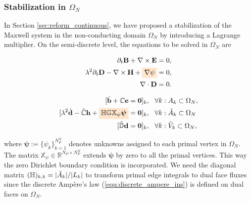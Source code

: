\documentclass{article}
\begin{document}
\subsubsection{Stabilization in $\Omega_N$} \label{sec:reform-discrete}

In Section \ref{sec:reform_continuous}, we have proposed a stabilization of the Maxwell
system in the non-conducting domain $\Omega_N$ by introducing a Lagrange multiplier. On
the semi-discrete level, the equations to be solved in $\Omega_N$ are
\begin{center}
    \begin{minipage}{0.3\textwidth}
    \begin{align*}
        \partial_t \mathbf{B} + \nabla \times \mathbf{E} &= 0, \\ 
        \lambda^2 \partial_t \mathbf{D} - \nabla \times \mathbf{H} + \colorbox{orange!20}{$\nabla \psi$} &= 0, \\
        \nabla \cdot \mathbf{D} &= 0. 
    \end{align*}
    \end{minipage}
    \begin{minipage}{0.1\textwidth}
    \centering
    \end{minipage}
    \begin{minipage}{0.5\textwidth}
        \begin{subequations}
        \begin{align}
            [\dot{\mathbf{b}} + \mathbb{C}\mathbf{e} &= \mathbf{0}]_k,\ \ \forall k:A_k \subset \Omega_N,\\
            [\lambda^2\dot{\mathbf{d}} - \Tilde{\mathbb{C}}\mathbf{h} + \colorbox{orange!20}{$\mathbb{H} \mathbb{G} \mathbb{X}_\psi \bm{\psi}$}&= \mathbf{0}]_k, \ \ \forall k: \Tilde{A}_k \subset \Omega_N \label{equ:discrete_ampere_ins}\\
            [\Tilde{\mathbb{D}}\mathbf{d} &= \mathbf{0}]_k,\ \ \forall k:\Tilde{V}_k \subset \Omega_N \label{equ:discrete_zero_div}, 
        \end{align} 
    \end{subequations}
    \end{minipage}
\end{center}
where $\bm{\psi} := \{\psi_k\}_{k=1}^{N_P^N}$ denotes unknowns assigned to each primal
vertex in $\Omega_N$. The matrix $\mathbb{X}_\psi \in \mathbb{R}^{N_P \times N_P^{N}}$
extends $\bm{\psi}$ by zero to all the primal vertices. This way the zero Dirichlet
boundary condition is incorporated. We need the diagonal matrix
$(\mathbb{H})_{k,k} = {|\Tilde{A}_k|}/{|L_k|}$ to transform primal edge integrals to dual
face fluxes since the discrete Amp\`{e}re's law (\ref{equ:discrete_ampere_ins}) is defined
on dual faces on $\Omega_N$.
\end{document}

